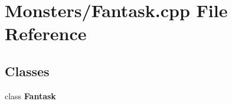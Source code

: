 \section{Monsters/\-Fantask.cpp File Reference}
\label{_fantask_8cpp}
\subsection*{Classes}
\begin{DoxyCompactItemize}
\item 
class {\bf Fantask}
\end{DoxyCompactItemize}
